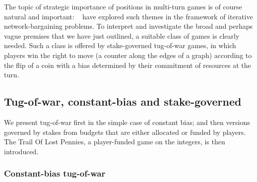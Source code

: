 \documentclass[letterpaper,11pt,oneside,reqno]{amsbook}
\numberwithin{figure}{chapter}
\theoremstyle{definition}
\theoremstyle{definition}
\theoremstyle{definition}
\theoremstyle{definition}
\theoremstyle{definition}
\begin{document}
The topic of strategic importance of positions in multi-turn games is of course natural and important: 
 ~\cite{KleinbergTardos,Azar,Kanoria} have explored such themes in the framework of iterative network-bargaining problems.
 To interpret and investigate the broad and perhaps vague premises that we have just outlined, a suitable class of games is clearly needed. 
Such a class is offered by stake-governed tug-of-war games, in which players win the right to move (a counter along the edges of a graph) according to the flip of a coin with a bias determined by their commitment of resources at the turn. 

\subsection{Tug-of-war, constant-bias and stake-governed}\label{s.tugofwar}


We present tug-of-war first in the simple case of constant bias; and then versions governed by stakes from budgets that are either allocated or funded by players. The Trail Of Lost Pennies, a player-funded game on the integers, is then introduced.

\medskip

\subsubsection{Constant-bias tug-of-war}
\end{document}
